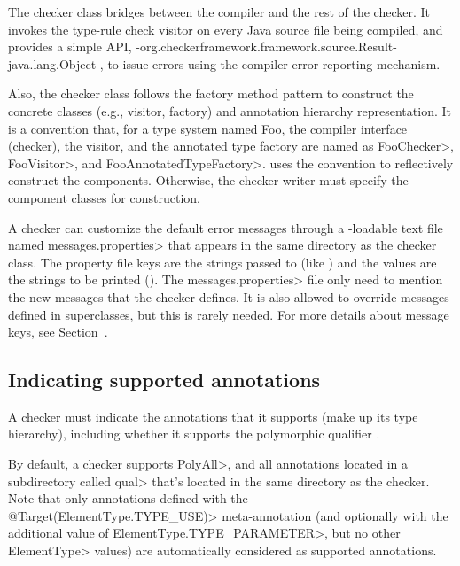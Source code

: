 The checker class bridges between the compiler and the rest of the checker.  It
invokes the type-rule check visitor on every Java source file being
compiled, and provides a simple API,
{-org.checkerframework.framework.source.Result-java.lang.Object-}, to issue
errors using the compiler error reporting mechanism.

Also, the checker class follows the factory method pattern to
construct the concrete classes (e.g., visitor, factory) and annotation
hierarchy representation.  It is a convention that, for
a type system named Foo, the compiler
interface (checker), the visitor, and the annotated type factory are
named as \<FooChecker>, \<FooVisitor>, and \<FooAnnotatedTypeFactory>.
 uses the convention to
reflectively construct the components.  Otherwise, the checker writer
must specify the component classes for construction.

\begin{sloppypar}
A checker can customize the default error messages through a
-loadable text file named
\<messages.properties> that appears in the same directory as the checker class.
The property file keys are the strings passed to 
(like ) and the values are the strings to be
printed ().
The \<messages.properties> file only need to mention the new messages that
the checker defines.
It is also allowed to override messages defined in superclasses, but this
is rarely needed.
For more details about message keys, see Section~.
\end{sloppypar}

\subsection{Indicating supported annotations\label{creating-indicating-supported-annotations}}

A checker must indicate the annotations that it supports (make up its type
hierarchy), including whether it supports the polymorphic qualifier
.

By default, a checker supports \<PolyAll>, and all annotations located in a
subdirectory called \<qual> that's located in the same directory as the checker.
Note that only annotations defined with the \<@Target(ElementType.TYPE\_USE)>
meta-annotation (and optionally with the additional value of
\<ElementType.TYPE\_PARAMETER>, but no other \<ElementType> values)
are automatically considered as supported annotations.

